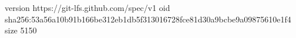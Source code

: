 version https://git-lfs.github.com/spec/v1
oid sha256:53a56a10b91b166be312eb1db5f313016728fce81d30a9bcbe9a09875610e1f4
size 5150
